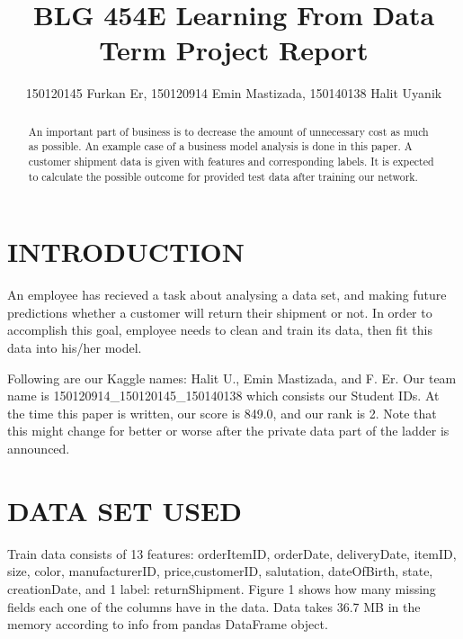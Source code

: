 \documentclass[a4paper, 10pt, conference]{ieeeconf}
\title{\LARGE \bf
BLG 454E Learning From Data\\ Term Project Report
}
\author{150120145 Furkan Er, 150120914 Emin Mastizada, 150140138 Halit Uyanik}
\begin{document}
\maketitle
\thispagestyle{empty}
\pagestyle{empty}

\begin{abstract}

An important part of business is to decrease the amount of unnecessary cost as much as possible. An example case of a business model analysis is done in this paper. A customer shipment data is given with features and corresponding labels. It is expected to calculate the possible outcome for provided test data after training our network.

\end{abstract}

\section{INTRODUCTION}

An employee has recieved a task about analysing a data set, and making future predictions whether a customer will return their shipment or not. In order to accomplish this goal, employee needs to clean and train its data, then fit this data into his/her model.

Following are our Kaggle names: Halit U., Emin Mastizada, and F. Er. Our team name is
150120914\_150120145\_150140138 which consists our Student IDs. At the time this paper is written, our score is 849.0, and our rank is 2. Note that this might change for better or worse after the private data part of the ladder is announced.

\section{DATA SET USED}

Train data consists of 13 features: orderItemID, orderDate, deliveryDate, itemID, size, color, manufacturerID, price,customerID, salutation, dateOfBirth, state, creationDate, and 1 label: returnShipment. Figure 1 shows how many missing fields each one of the columns have in the data. Data takes 36.7 MB in the memory according to info from pandas DataFrame object.
\end{document}
